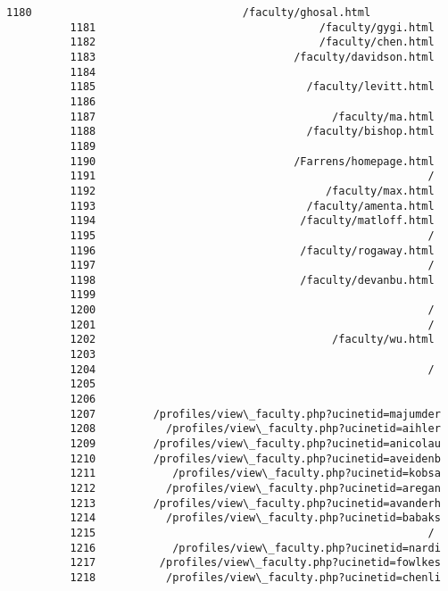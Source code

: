 \documentclass[11pt]{article}
\begin{document}
\begin{Verbatim}[commandchars=\\\{\}]
          1180                                 /faculty/ghosal.html
          1181                                   /faculty/gygi.html
          1182                                   /faculty/chen.html
          1183                               /faculty/davidson.html
          1184                                                     
          1185                                 /faculty/levitt.html
          1186                                                     
          1187                                     /faculty/ma.html
          1188                                 /faculty/bishop.html
          1189                                                     
          1190                               /Farrens/homepage.html
          1191                                                    /
          1192                                    /faculty/max.html
          1193                                 /faculty/amenta.html
          1194                                /faculty/matloff.html
          1195                                                    /
          1196                                /faculty/rogaway.html
          1197                                                    /
          1198                                /faculty/devanbu.html
          1199                                                     
          1200                                                    /
          1201                                                    /
          1202                                     /faculty/wu.html
          1203                                                     
          1204                                                    /
          1205                                                     
          1206                                                     
          1207         /profiles/view\_faculty.php?ucinetid=majumder
          1208           /profiles/view\_faculty.php?ucinetid=aihler
          1209         /profiles/view\_faculty.php?ucinetid=anicolau
          1210         /profiles/view\_faculty.php?ucinetid=aveidenb
          1211            /profiles/view\_faculty.php?ucinetid=kobsa
          1212           /profiles/view\_faculty.php?ucinetid=aregan
          1213         /profiles/view\_faculty.php?ucinetid=avanderh
          1214           /profiles/view\_faculty.php?ucinetid=babaks
          1215                                                    /
          1216            /profiles/view\_faculty.php?ucinetid=nardi
          1217          /profiles/view\_faculty.php?ucinetid=fowlkes
          1218           /profiles/view\_faculty.php?ucinetid=chenli

\end{Verbatim}
\end{document}
